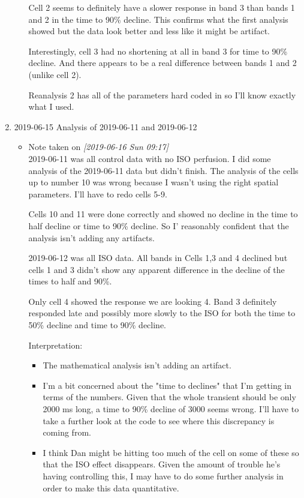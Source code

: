 \documentclass[11pt]{article}
\begin{document}
\begin{enumerate}
\begin{itemize}
Cell 2 seems to definitely have a slower response in band 3 than bands 1 and 2 in the time to 90\% decline.  This confirms what the first analysis showed but the data look better and less like it might be artifact.

Interestingly, cell 3 had no shortening at all in band 3 for time to 90\% decline.  And there appears to be a real difference between bands 1 and 2 (unlike cell 2).

Reanalysis 2 has all of the parameters hard coded in so I'll know exactly what I used.
\end{itemize}

\item 2019-06-15 Analysis of 2019-06-11 and 2019-06-12
\label{sec:orgc0c29b6}
\begin{itemize}
\item Note taken on \textit{[2019-06-16 Sun 09:17] } \\
2019-06-11 was all control data with no ISO perfusion.  I did some analysis of the 2019-06-11 data but didn't finish.  The analysis of the cells up to number 10 was wrong because I wasn't using the right spatial parameters.  I'll have to redo cells 5-9.

Cells 10 and 11 were done correctly and showed no decline in the time to half decline or time to 90\% decline.  So I' reasonably confident that the analysis isn't adding any artifacts.

2019-06-12 was all ISO data.  All bands in Cells 1,3 and 4 declined but cells 1 and 3 didn't show any apparent difference in the decline of the times to half and 90\%.

Only cell 4 showed the response we are looking 4.  Band 3 definitely responded late and possibly more slowly to the ISO for both the time to 50\% decline and time to 90\% decline.

Interpretation:

\begin{itemize}
\item The mathematical analysis isn't adding an artifact.

\item I'm a bit concerned about the "time to declines" that I'm getting in terms of the numbers.  Given that the whole transient should be only 2000 ms long, a time to 90\% decline of 3000 seems wrong.  I'll have to take a further look at the code to see where this discrepancy is coming from.

\item I think Dan might be hitting too much of the cell on some of these so that the ISO effect disappears.  Given the amount of trouble he's having controlling this, I may have to do some further analysis in order to make this data quantitative.
\end{itemize}


\end{itemize}
\end{enumerate}
\end{document}
